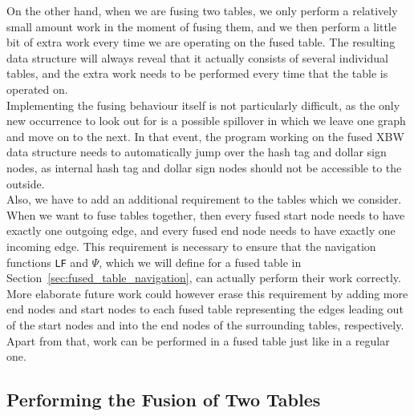 \documentclass[a4paper,12pt,twoside,BCOR=10mm]{scrbook}
\begin{document}
On the other hand, when we are fusing two tables,
we only perform a relatively small amount work in the moment of fusing them,
and we then perform a little bit of extra work every time we are operating on the fused table.
The resulting data structure will always reveal that it actually consists of several
individual tables, and the extra work needs to be performed every time that the table is operated on. \\
Implementing the fusing behaviour itself is not particularly difficult,
as the only new occurrence to look out for is a possible spillover in which
we leave one graph and move on to the next. In that event, the program working
on the fused XBW data structure needs to automatically jump over the hash tag and dollar sign nodes,
as internal hash tag and dollar sign nodes should not be accessible to the outside. \\
Also, we have to add an additional requirement to the tables which we consider.
When we want to fuse tables together, then every fused start node needs to have
exactly one outgoing edge, and every fused end node needs to have exactly one incoming edge.
This requirement is necessary to ensure that the navigation functions \texttt{LF} and $\Psi$,
which we will define for a fused table
in Section~\ref{sec:fused_table_navigation}, can actually perform their work correctly.
More elaborate future work could however erase this requirement by adding more end nodes and start nodes
to each fused table representing the edges leading out of the start nodes and into the end nodes of the surrounding tables,
respectively. \\
Apart from that, work can be performed in a fused table just like in a regular one.

\subsection{Performing the Fusion of Two Tables}
\label{sec:perform_fusion_of_two_tables}
\end{document}
